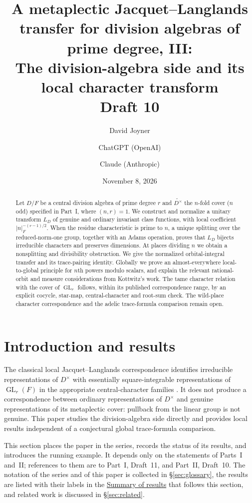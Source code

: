 \documentclass[11pt]{article}
\title{A metaplectic Jacquet--Langlands transfer for division algebras of prime degree, III:\\
The division-algebra side and its local character transform\\[0.4em]\normalsize Draft 10}
\author{David Joyner \and ChatGPT (OpenAI) \and Claude (Anthropic)}
\date{November 8, 2026}
\newcommand{\GL}{\operatorname{GL}}
\theoremstyle{plain}
\theoremstyle{definition}
\begin{document}
\maketitle
\begin{abstract}
Let $D/F$ be a central division algebra of prime degree $r$ and
$\widetilde{D^\times}$ the $n$-fold cover ($n$ odd) specified in
Part~I, where $(n,r)=1$. We construct and normalize a unitary
transform $L_D$ of genuine and ordinary invariant class functions,
with local coefficient $|n|_F^{-(r-1)/2}$. When the residue characteristic
is prime to $n$, a unique splitting over the reduced-norm-one group,
together with an Adams operation, proves that $L_D$ bijects irreducible
characters and preserves dimensions. At places dividing $n$ we obtain
a nonsplitting and divisibility obstruction. We give the normalized
orbital-integral transfer and its trace-pairing identity. Globally we
prove an almost-everywhere local-to-global principle for $n$th powers
modulo scalars, and explain the relevant rational-orbit and measure
considerations from Kottwitz's work. The tame character relation with the cover of $\GL_r$ follows, within
its published correspondence range, by an explicit cocycle, star-map,
central-character and root-sum check. The wild-place character
correspondence and the adelic trace-formula comparison remain open.
\end{abstract}
\tableofcontents

\section{Introduction and results}
The classical local Jacquet--Langlands correspondence identifies
irreducible representations of $D^\times$ with essentially
square-integrable representations of $\GL_r(F)$ in the appropriate
central-character families \cite{DKV}. It does not produce a
correspondence between ordinary representations of $D^\times$ and
genuine representations of its metaplectic cover: pullback from the
linear group is not genuine. This paper studies the division-algebra
side directly and provides local results independent of a conjectural
global trace-formula comparison.

This section places the paper in the series, records the status of its results, and introduces the running example. It depends only on the statements of Parts~I and~II; references to them are to Part~I, Draft~11, and Part~II, Draft~10. The notation of the series and of this paper is collected in \S\ref{sec:glossary}, the results are listed with their labels in the \hyperref[sec:summary]{Summary of results} that follows this section, and related work is discussed in \S\ref{sec:related}.
\end{document}
